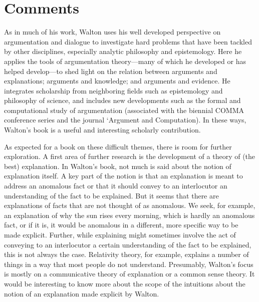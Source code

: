 \documentclass[12pt]{article}
\begin{document}
\section{Comments}
\label{comments}

\noindent As in much of his work, Walton uses his well developed perspective on argumentation and dialogue to investigate hard problems 
that have been tackled by other disciplines, especially analytic philosophy and epistemology. 
Here he applies the tools of argumentation theory---many of which he developed or has helped develop---to shed light on 
the relation between arguments and explanations; arguments and knowledge;
and arguments and evidence. 
He integrates scholarship from neighboring fields such as epistemology and philosophy of science, and includes 
new developments such as the formal and computational study of argumentation (associated with the biennial COMMA conference series and the journal `Argument and Computation). In these ways, Walton's book is a useful and interesting scholarly contribution.

As expected for a book on these difficult themes, there is room for further exploration. A first area of further research is the development of a theory of (the
best) explanation. In Walton's book, not much is said about the notion of
explanation itself. A key part of the notion is that an
explanation is meant to address an anomalous fact or that it should
convey to an interlocutor an understanding of the fact to be
explained. But it seems that there are explanations of facts that are not thought of as anomalous. We seek, for example, an
explanation of why the sun rises every morning, which is hardly an
anomalous fact, or if it is, it would be
anomalous in a different, more specific way to be made explicit. Further, while explaining might sometimes
involve the act of conveying to an interlocutor a certain
understanding of the fact to be explained, this is not always the
case. Relativity theory, for example, explains a number of things in a
way that most people do not understand. Presumably, Walton's focus is mostly on a
communicative theory of explanation or a common sense theory. It would be interesting to know more about the scope of the
intuitions about the notion of an explanation made explicit by Walton.
\end{document}
